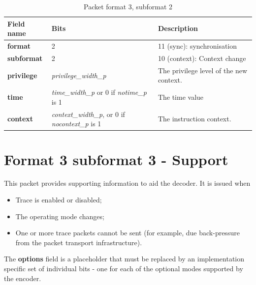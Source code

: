 \begin{table}[htp]
  \centering
  \caption{Packet format 3, subformat 2}
  \label{tab:te_inst3-2}
  \begin{tabulary}{\textwidth}{|l|p{35mm}|p{90mm}|}
    \hline
    {\bf Field name} & {\bf Bits} & {\bf Description} \\
    \hline
    \textbf{format} & 2 & 11 (sync): synchronisation\\
    \hline
    \textbf{subformat}  & 2 & 10 (context): Context change \\
    \hline
    \textbf{privilege} & \textit {privilege\_width\_p} & 
                The privilege level of the new context.\\
    \hline
    \textbf{time} &  \textit {time\_width\_p} or 0 if \textit {notime\_p} is 1 & 
               The time value \\
    \hline
    \textbf{context} &  \textit {context\_width\_p}, or 0 if \textit {nocontext\_p} is 1 & The instruction context. \\
    \hline
  \end{tabulary}
\end{table}

\section{Format 3 subformat 3 - Support} \label{sec:format33}

This packet provides supporting information to aid the decoder.  It is issued when

\begin{itemize}
  \item Trace is enabled or disabled;
  \item The operating mode changes;
  \item One or more trace packets cannot be sent (for example, due back-pressure from the packet transport infrastructure).
\end{itemize}

The \textbf{options} field is a placeholder that must be replaced by an implementation specific set of individual bits - one for each of the
optional modes supported by the encoder.


